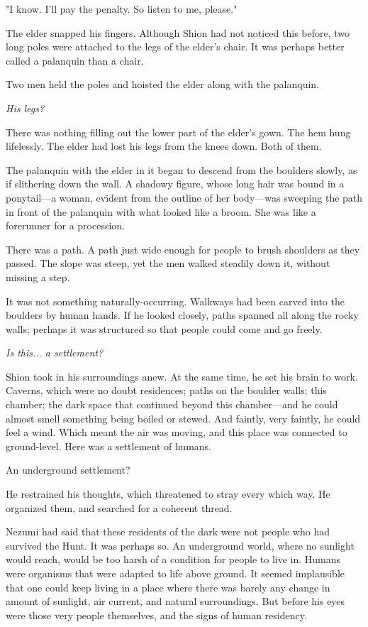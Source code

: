 "I know. I'll pay the penalty. So listen to me, please."

The elder snapped his fingers. Although Shion had not noticed this
before, two long poles were attached to the legs of the elder's chair.
It was perhaps better called a palanquin than a chair.

Two men held the poles and hoisted the elder along with the palanquin.

\emph{His legs?}

There was nothing filling out the lower part of the elder's gown. The
hem hung lifelessly. The elder had lost his legs from the knees down.
Both of them.

The palanquin with the elder in it began to descend from the boulders
slowly, as if slithering down the wall. A shadowy figure, whose long
hair was bound in a ponytail---a woman, evident from the outline of her
body---was sweeping the path in front of the palanquin with what looked
like a broom. She was like a forerunner for a procession.

There was a path. A path just wide enough for people to brush shoulders
as they passed. The slope was steep, yet the men walked steadily down
it, without missing a step.

It was not something naturally-occurring. Walkways had been carved into
the boulders by human hands. If he looked closely, paths spanned all
along the rocky walls; perhaps it was structured so that people could
come and go freely.

\emph{Is this... a settlement?}

Shion took in his surroundings anew. At the same time, he set his brain
to work. Caverns, which were no doubt residences; paths on the boulder
walls; this chamber; the dark space that continued beyond this
chamber---and he could almost smell something being boiled or stewed. And
faintly, very faintly, he could feel a wind. Which meant the air was
moving, and this place was connected to ground-level. Here was a
settlement of humans.

An underground settlement?

He restrained his thoughts, which threatened to stray every which way.
He organized them, and searched for a coherent thread.

Nezumi had said that these residents of the dark were not people who had
survived the Hunt. It was perhaps so. An underground world, where no
sunlight would reach, would be too harsh of a condition for people to
live in. Humans were organisms that were adapted to life above ground.
It seemed implausible that one could keep living in a place where there
was barely any change in amount of sunlight, air current, and natural
surroundings. But before his eyes were those very people themselves, and
the signs of human residency.

